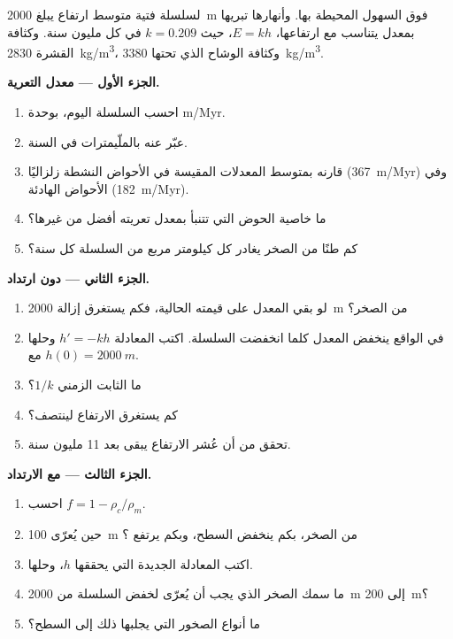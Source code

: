\begin{problem}
\label{pb:g12:destruction-of-mountains:1}
لسلسلة فتية متوسط ارتفاع يبلغ \qty{2000}{m} فوق السهول المحيطة
بها. وأنهارها تبريها بمعدل يتناسب مع ارتفاعها، $E = kh$،
حيث $k = 0.209$ في كل مليون سنة. وكثافة القشرة
\qty{2830}{kg/m^3}، وكثافة الوشاح الذي تحتها \qty{3380}{kg/m^3}.

\medskip
\noindent\textbf{الجزء الأول --- معدل التعرية.}
\begin{enumerate}
  \item احسب  السلسلة اليوم، بوحدة \unit{m/Myr}.
  \item عبّر عنه بالملّيمترات في السنة.
  \item قارنه بمتوسط المعدلات المقيسة في الأحواض النشطة زلزاليًا
        (\qty{367}{m/Myr}) وفي الأحواض الهادئة (\qty{182}{m/Myr}).
  \item ما خاصية الحوض التي تتنبأ بمعدل تعريته أفضل من غيرها؟
  \item كم طنًا من الصخر يغادر كل كيلومتر مربع من السلسلة
        كل سنة؟
\end{enumerate}

\medskip
\noindent\textbf{الجزء الثاني --- دون ارتداد.}
\begin{enumerate}[resume]
  \item لو بقي المعدل على قيمته الحالية، فكم يستغرق
        إزالة \qty{2000}{m} من الصخر؟
  \item في الواقع ينخفض المعدل كلما انخفضت السلسلة. اكتب المعادلة
        $h' = -kh$ وحلها مع $h(0) = \qty{2000}{m}$.
  \item ما الثابت الزمني $1/k$؟
  \item كم يستغرق الارتفاع لينتصف؟
  \item تحقق من أن عُشر الارتفاع يبقى بعد 11 مليون سنة.
\end{enumerate}

\medskip
\noindent\textbf{الجزء الثالث --- مع الارتداد.}
\begin{enumerate}[resume]
  \item احسب $f = 1 - \rho_c/\rho_m$.
  \item حين يُعرّى \qty{100}{m} من الصخر، بكم ينخفض
        السطح، وبكم يرتفع ؟
  \item اكتب المعادلة الجديدة التي يحققها $h$، وحلها.
  \item ما سمك الصخر الذي يجب أن يُعرّى لخفض السلسلة من
        \qty{2000}{m} إلى \qty{200}{m}؟
  \item ما أنواع الصخور التي يجلبها ذلك إلى السطح؟
\end{enumerate}


\end{problem}
